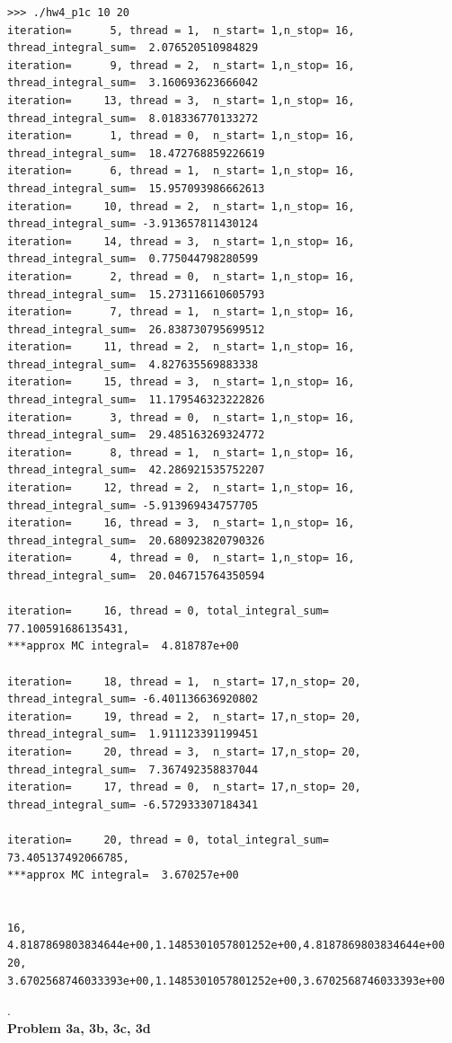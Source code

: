 \documentclass{article}
\begin{document}
\begin{lstlisting}
>>> ./hw4_p1c 10 20 
iteration=      5, thread = 1,  n_start= 1,n_stop= 16, thread_integral_sum=  2.076520510984829 
iteration=      9, thread = 2,  n_start= 1,n_stop= 16, thread_integral_sum=  3.160693623666042 
iteration=     13, thread = 3,  n_start= 1,n_stop= 16, thread_integral_sum=  8.018336770133272 
iteration=      1, thread = 0,  n_start= 1,n_stop= 16, thread_integral_sum=  18.472768859226619 
iteration=      6, thread = 1,  n_start= 1,n_stop= 16, thread_integral_sum=  15.957093986662613 
iteration=     10, thread = 2,  n_start= 1,n_stop= 16, thread_integral_sum= -3.913657811430124 
iteration=     14, thread = 3,  n_start= 1,n_stop= 16, thread_integral_sum=  0.775044798280599 
iteration=      2, thread = 0,  n_start= 1,n_stop= 16, thread_integral_sum=  15.273116610605793 
iteration=      7, thread = 1,  n_start= 1,n_stop= 16, thread_integral_sum=  26.838730795699512 
iteration=     11, thread = 2,  n_start= 1,n_stop= 16, thread_integral_sum=  4.827635569883338 
iteration=     15, thread = 3,  n_start= 1,n_stop= 16, thread_integral_sum=  11.179546323222826 
iteration=      3, thread = 0,  n_start= 1,n_stop= 16, thread_integral_sum=  29.485163269324772 
iteration=      8, thread = 1,  n_start= 1,n_stop= 16, thread_integral_sum=  42.286921535752207 
iteration=     12, thread = 2,  n_start= 1,n_stop= 16, thread_integral_sum= -5.913969434757705 
iteration=     16, thread = 3,  n_start= 1,n_stop= 16, thread_integral_sum=  20.680923820790326 
iteration=      4, thread = 0,  n_start= 1,n_stop= 16, thread_integral_sum=  20.046715764350594 

iteration=     16, thread = 0, total_integral_sum=  77.100591686135431, 
***approx MC integral=  4.818787e+00 

iteration=     18, thread = 1,  n_start= 17,n_stop= 20, thread_integral_sum= -6.401136636920802 
iteration=     19, thread = 2,  n_start= 17,n_stop= 20, thread_integral_sum=  1.911123391199451 
iteration=     20, thread = 3,  n_start= 17,n_stop= 20, thread_integral_sum=  7.367492358837044 
iteration=     17, thread = 0,  n_start= 17,n_stop= 20, thread_integral_sum= -6.572933307184341 

iteration=     20, thread = 0, total_integral_sum=  73.405137492066785, 
***approx MC integral=  3.670257e+00 


16, 4.8187869803834644e+00,1.1485301057801252e+00,4.8187869803834644e+00 
20, 3.6702568746033393e+00,1.1485301057801252e+00,3.6702568746033393e+00  

\end{lstlisting}
.
\newline
\\
{\bf Problem 3a, 3b, 3c, 3d}
\end{document}
